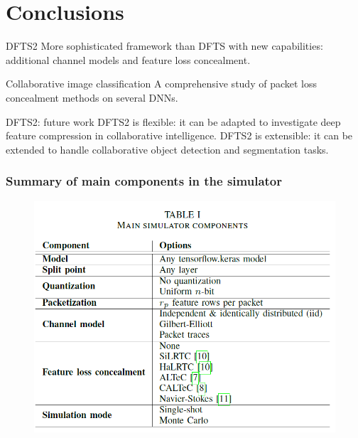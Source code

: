 \documentclass[aspectratio=169]{beamer}
\begin{document}
\section{Conclusions}
\begin{frame}
	\begin{block}{DFTS2}
		More sophisticated framework than DFTS with new capabilities: additional channel models and feature loss concealment.
	\end{block}
\begin{block}{Collaborative image classification}
	A comprehensive study of packet loss concealment methods on several DNNs.
\end{block}
\begin{block}{DFTS2: future work}
DFTS2 is flexible: it can be adapted to investigate deep feature compression in collaborative intelligence. DFTS2 is extensible: it can be extended to handle collaborative object detection and segmentation tasks.
\end{block}
\end{frame}

\begin{frame}
	\frametitle{Summary of main components in the simulator}
\begin{figure}[H]
	\centering
	\includegraphics[scale=0.37]{mainsimulatorcomponents.png}
\end{figure}
\end{frame}
\end{document}
